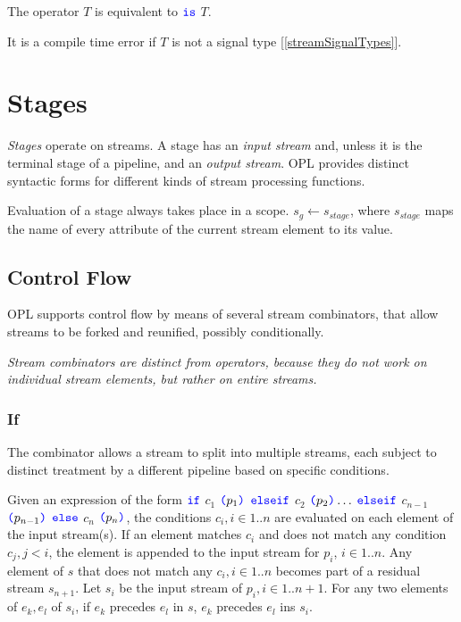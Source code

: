 \documentclass{article}
\begin{document}
The operator \REJECT{} $T$ is equivalent to \WHERE{} \NOT{} $\texttt{\color{blue} is}{}$ $T$.

It is a compile time error if $T$ is not a signal type [\ref{streamSignalTypes}].


\section{Stages}
\label{stages}

{\em Stages} operate on streams.  A stage has an {\em input stream} and, unless it is the terminal stage of a pipeline, and an {\em output stream}. OPL provides distinct syntactic forms for different kinds of stream processing functions.

Evaluation of a stage always takes place in a scope. $s_g \leftarrow s_{stage}$, where $s_{stage}$  maps the name of  every attribute of the current stream element to its value.

\subsection{Control Flow}
\label{controlFlow}

OPL supports control flow by means of several stream combinators, that allow streams to be forked and reunified, possibly conditionally.

{\em
Stream combinators are distinct from operators, because they do not work on individual stream elements, but rather on entire streams.
}
\Control{}

\subsubsection{If}
\label{if}

The \IF{} combinator allows a stream to split into multiple streams, each subject to distinct treatment  by a different pipeline based on specific conditions.

\IfExpression{}

Given an \IF{} expression of the form $\texttt{\color{blue} if}{}$ $c_1$ $\texttt{\color{blue} (}{} p_1 \texttt{\color{blue} )}{}$ $\texttt{\color{blue} else}{} \texttt{\color{blue} if}{}$ $c_2$  $\texttt{\color{blue} (}{} p_2 \texttt{\color{blue} )}{} \ldots$ $\texttt{\color{blue} else}{} \texttt{\color{blue} if}{} $ $c_{n-1}$  $\texttt{\color{blue} (}{} p_{n-1} \texttt{\color{blue} )}{}$  $\texttt{\color{blue} else}$  $c_n$ $\texttt{\color{blue} (}{} p_n \texttt{\color{blue} )}{}$, the conditions $c_i , i \in 1 .. n$ are evaluated on each element of the input stream(s). If an element matches $c_i$ and does not match any condition $c_j, j < i$, the element is appended to the input stream for $p_i$, $ i \in 1 .. n$. Any element of $s$ that does not match any $c_i, i \in 1..n$ becomes part of a residual stream $s_{n+1}$. Let $s_i$ be  the input stream of  $p_i, i \in 1..n+1$. For any two elements of $e_k, e_l$ of $s_i$, if $e_k$ precedes $e_l$ in $s$, $e_k$ precedes $e_l$ ins $s_i$.
\end{document}
